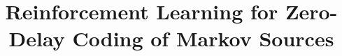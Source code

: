 \documentclass[conference]{IEEEtran}
\begin{document}
\title{Reinforcement Learning for Zero-Delay Coding of Markov Sources
}


\maketitle

\end{document}
